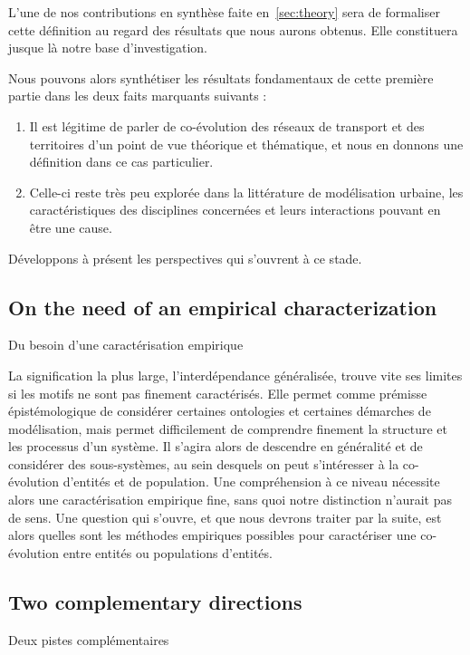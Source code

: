 L'une de nos contributions en synthèse faite en~\ref{sec:theory} sera de formaliser cette définition au regard des résultats que nous aurons obtenus. Elle constituera jusque là notre base d'investigation.


Nous pouvons alors synthétiser les résultats fondamentaux de cette première partie dans les deux faits marquants suivants :
\begin{enumerate}
	\item Il est légitime de parler de co-évolution des réseaux de transport et des territoires d'un point de vue théorique et thématique, et nous en donnons une définition dans ce cas particulier.
	\item Celle-ci reste très peu explorée dans la littérature de modélisation urbaine, les caractéristiques des disciplines concernées et leurs interactions pouvant en être une cause.
\end{enumerate}

Développons à présent les perspectives qui s'ouvrent à ce stade.


\subsection*{On the need of an empirical characterization}{Du besoin d'une caractérisation empirique}

La signification la plus large, l'interdépendance généralisée, trouve vite ses limites si les motifs ne sont pas finement caractérisés. Elle permet comme prémisse épistémologique de considérer certaines ontologies et certaines démarches de modélisation, mais permet difficilement de comprendre finement la structure et les processus d'un système. Il s'agira alors de descendre en généralité et de considérer des sous-systèmes, au sein desquels on peut s'intéresser à la co-évolution d'entités et de population. Une compréhension à ce niveau nécessite alors une caractérisation empirique fine, sans quoi notre distinction n'aurait pas de sens. Une question qui s'ouvre, et que nous devrons traiter par la suite, est alors quelles sont les méthodes empiriques possibles pour caractériser une co-évolution entre entités ou populations d'entités.


\subsection*{Two complementary directions}{Deux pistes complémentaires}




